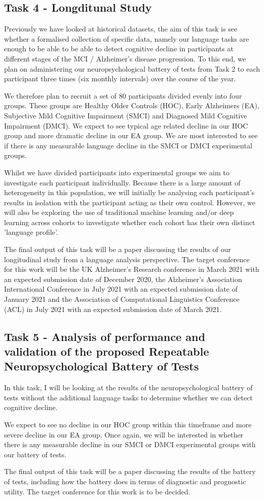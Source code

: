 \documentclass[10pt, letterpaper, twoside, openany]{book}
\begin{document}
\subsection{Task 4 - Longditunal Study}
Previously we have looked at historical datasets, the aim of this task is see whether a formalised collection of specific data, namely our language tasks are enough to be able to be able to detect cognitive decline in participants at different stages of the MCI / Alzheimer's disease progression. To this end, we plan on administering our neuropsychological battery of tests from Task 2 to each participant three times (six monthly intervals) over the course of the year. 
\par 
We therefore plan to recruit a set of 80 participants divided evenly into four groups. These groups are Healthy Older Controls (HOC), Early Alzheimers (EA), Subjective Mild Cognitive Impairment (SMCI) and Diagnosed Mild Cognitive Impairment (DMCI). We expect to see typical age related decline in our HOC group and more dramatic decline in our EA group. We are most interested to see if there is any measurable language decline in the SMCI or DMCI experimental groups.
\par 
Whilst we have divided participants into experimental groups we aim to investigate each participant individually. Because there is a large amount of heterogeneity in this population, we will initially be analysing each participant's results in isolation with the participant acting as their own control. However, we will also be exploring the use of traditional machine learning and/or deep learning across cohorts to investigate whether each cohort has their own distinct 'language profile'.
\par 
The final output of this task will be a paper discussing the results of our longitudinal study from a language analysis perspective. The target conference for this work will be the UK Alzheimer's Research conference in March 2021 with an expected submission date of December 2020, the Alzheimer's Association International Conference in July 2021 with an expected submission date of January 2021 and the Association of Computational Linguistics Conference (ACL) in July 2021 with an expected submission date of March 2021.
\subsection{Task 5 - Analysis of performance and validation of the proposed Repeatable Neuropsychological Battery of Tests}  
In this task, I will be looking at the results of the neuropsychological battery of tests without the additional language tasks to determine whether we can detect cognitive decline. 
\par 
We expect to see no decline in our HOC group within this timeframe and more severe decline in our EA group. Once again, we will be interested in whether there is any measurable decline in our SMCI or DMCI experimental groups with our battery of tests.
\par 
The final output of this task will be a paper discussing the results of the battery of tests, including how the battery does in terms of diagnostic and prognostic utility. The target conference for this work is to be decided. 
\end{document}
